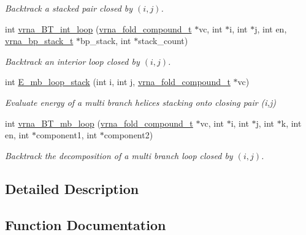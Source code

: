\begin{DoxyCompactItemize}
\begin{DoxyCompactList}\small\item\em Backtrack a stacked pair closed by $ (i,j) $. \end{DoxyCompactList}\item 
int \hyperlink{group__loops_ga849b7dc373b6c0b029672e16a7e52053}{vrna\+\_\+\+B\+T\+\_\+int\+\_\+loop} (\hyperlink{group__fold__compound_ga1b0cef17fd40466cef5968eaeeff6166}{vrna\+\_\+fold\+\_\+compound\+\_\+t} $\ast$vc, int $\ast$i, int $\ast$j, int en, \hyperlink{group__data__structures_gaa651bda42e7692f08cb603cd6834b0ee}{vrna\+\_\+bp\+\_\+stack\+\_\+t} $\ast$bp\+\_\+stack, int $\ast$stack\+\_\+count)\hypertarget{group__loops_ga849b7dc373b6c0b029672e16a7e52053}{}\label{group__loops_ga849b7dc373b6c0b029672e16a7e52053}

\begin{DoxyCompactList}\small\item\em Backtrack an interior loop closed by $ (i,j) $. \end{DoxyCompactList}\item 
int \hyperlink{group__loops_ga81d73d23f480f84df8cfd0042c032503}{E\+\_\+mb\+\_\+loop\+\_\+stack} (int i, int j, \hyperlink{group__fold__compound_ga1b0cef17fd40466cef5968eaeeff6166}{vrna\+\_\+fold\+\_\+compound\+\_\+t} $\ast$vc)
\begin{DoxyCompactList}\small\item\em Evaluate energy of a multi branch helices stacking onto closing pair (i,j) \end{DoxyCompactList}\item 
int \hyperlink{group__loops_ga9cb520ddfd8b3a48089a7910b045d06b}{vrna\+\_\+\+B\+T\+\_\+mb\+\_\+loop} (\hyperlink{group__fold__compound_ga1b0cef17fd40466cef5968eaeeff6166}{vrna\+\_\+fold\+\_\+compound\+\_\+t} $\ast$vc, int $\ast$i, int $\ast$j, int $\ast$k, int en, int $\ast$component1, int $\ast$component2)
\begin{DoxyCompactList}\small\item\em Backtrack the decomposition of a multi branch loop closed by $ (i,j) $. \end{DoxyCompactList}\end{DoxyCompactItemize}


\subsection{Detailed Description}


\subsection{Function Documentation}

